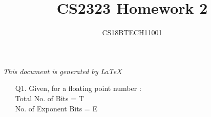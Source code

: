 \documentclass[letterpaper]{article}
\title{CS2323 Homework 2}
\author{CS18BTECH11001}
\begin{document}
\begin{large}
\maketitle
\begin{center}
\textit{This document is generated by \LaTeX}
\end{center}
\begin{flushleft}
\begin{enumerate}

\item[Q1. ]
Given, for a floating point number :\\[0.1in]
Total No. of Bits = T\\[0.1in]
No. of Exponent Bits = E\\[0.1in]
\begin{enumerate}


\end{enumerate}
\end{enumerate}
\end{flushleft}
\end{large}
\end{document}
